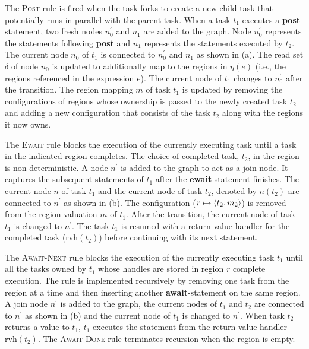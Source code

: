 The \textsc{Post} rule is fired when the task forks to create a new child task that potentially runs in parallel with the parent task. When a task $t_1$ executes a \textbf{post} statement, two fresh nodes $n_0^\prime$ and $n_1$ are added to the graph. Node $n_0^\prime$ represents the statements following \textbf{post} and $n_1$ represents the statements executed by $t_2$. The current node $n_0$ of $t_1$ is connected to $n_0^\prime$ and $n_1$ as shown in (a). The read set $\delta$ of node $n_0$ is updated to additionally map to the regions in $\eta(e)$ (i.e., the regions referenced in the expression $e$). The current node of $t_1$ changes to $n_0^\prime$ after the transition. The region mapping $m$ of task $t_1$ is updated by removing the configurations of regions whose ownership is passed to the newly created task $t_2$ and adding a new configuration that consists of the task $t_2$ along with the regions it now owns.

The \textsc{Ewait} rule blocks the execution of the currently executing task until a task in the indicated region completes. The choice of completed task, $t_2$, in the region is non-deterministic. A node $n^\prime$ is added to the graph to act as a join node. It captures the subsequent statements of $t_1$ after the \textbf{ewait} statement finishes. The current node $n$ of task $t_1$ and the current node of task $t_2$, denoted by $n(t_2)$ are connected to $n^\prime$ as shown in (b). The configuration ($r \mapsto \langle t_2,m_2 \rangle $) is removed from the region valuation $m$ of $t_1$. After the transition, the current node of task $t_1$ is changed to $n^\prime$.  The task $t_1$ is resumed with a return value handler for the completed task ($\mathrm{rvh}(t_2)$) before continuing with its next statement.

The \textsc{Await-Next} rule blocks the execution of the currently executing task $t_1$ until 
all the tasks owned by $t_1$ whose handles are stored in region $r$ complete execution.
The rule is implemented recursively by removing one task from the region at a time and then inserting another \textbf{await}-statement on the same region. A join node $n^\prime$ is added to the graph, the current nodes of $t_1$ and $t_2$ are connected to $n^\prime$ as shown in (b) and the current node of $t_1$ is changed to $n^\prime$. When task $t_2$ returns a value to $t_1$, $t_1$ executes the statement from the return value handler $\mathrm{rvh}(t_2)$. The \textsc{Await-Done} rule terminates recursion when the region is empty. 

